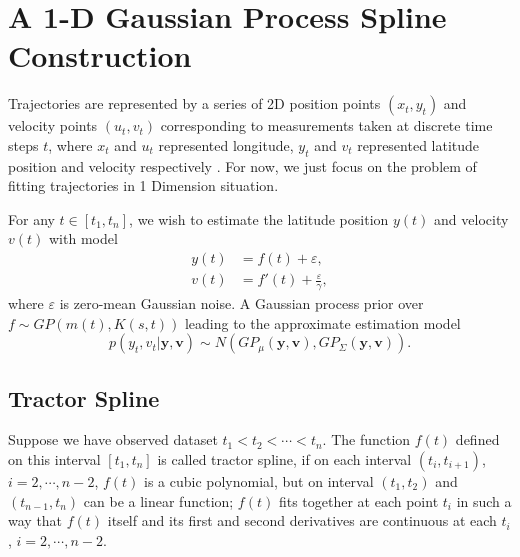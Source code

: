 \section{A 1-D Gaussian Process Spline Construction}
Trajectories are represented by a series of 2D position points $(x_t,y_t)$ and velocity points $(u_t,v_t)$ corresponding to measurements taken at discrete time steps $t$, where $x_t$ and $u_t$ represented longitude, $y_t$ and $v_t$ represented latitude position and velocity respectively \cite{ellis2009}. For now, we just focus on the problem of fitting trajectories in 1 Dimension situation. 

For any $t \in [t_1,t_n]$, we wish to estimate the latitude position $y(t)$ and velocity $v(t)$ with model
\begin{align}
y(t)&=f(t)+\varepsilon,\\
v(t)&=f'(t)+\frac{\varepsilon}{\gamma},
\end{align}
where $\varepsilon$ is zero-mean Gaussian noise. A Gaussian process prior over $f \sim GP(m(t),K(s,t))$ leading to the approximate estimation model
\begin{equation}\label{xvgp}
p(y_t,v_t | \mathbf{y}, \mathbf{v}) \sim N(GP_\mu (\mathbf{y}, \mathbf{v}), GP_\Sigma (\mathbf{y}, \mathbf{v})).
\end{equation} 

\subsection{Tractor Spline}
Suppose we have observed dataset $t_1<t_2<\cdots<t_n$. The function $f(t)$ defined on this interval $[t_1,t_n]$ is called tractor spline, if on each interval $(t_i,t_{i+1})$, $i=2,\cdots,n-2$, $f(t)$ is a cubic polynomial, but on interval $(t_1,t_2)$ and $(t_{n-1},t_n)$ can be a linear function; $f(t)$ fits together at each point $t_i$ in such a way that $f(t)$ itself and its first and second derivatives are continuous at each $t_i$,  $i=2,\cdots,n-2$.  

